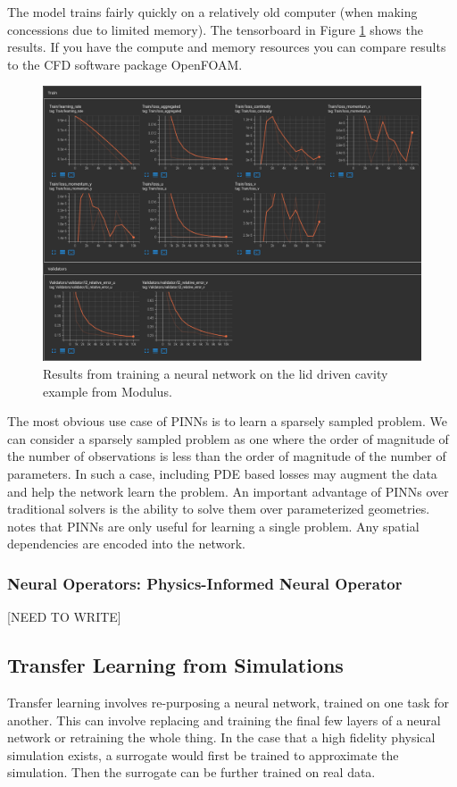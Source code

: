 \documentclass[]{article}
\begin{document}
The model trains fairly quickly on a relatively old computer (when making concessions due to limited memory).  The tensorboard in Figure \ref{fig:screenshot-2022-05-09-at-17-19-07-tensorboard} shows the results.  If you have the compute and memory resources you can compare results to the CFD software package OpenFOAM.
\begin{figure}
	\centering
	\includegraphics[width=0.7\linewidth]{"images/Screenshot 2022-05-09 at 17-19-07 TensorBoard"}
	\caption[ldc_results]{Results from training a neural network on the lid driven cavity example from Modulus.}
	\label{fig:screenshot-2022-05-09-at-17-19-07-tensorboard}
\end{figure}

The most obvious use case of PINNs is to learn a sparsely sampled problem.  We can consider a sparsely sampled problem as one where the order of magnitude of the number of observations is less than the order of magnitude of the number of parameters.  In such a case, including PDE based losses may augment the data and help the network learn the problem.  An important advantage of PINNs over traditional solvers is the ability to solve them over parameterized geometries.  \cite{neural_operators} notes that PINNs are only useful for learning a single problem.  Any spatial dependencies are encoded into the network.

\subsubsection{Neural Operators: Physics-Informed Neural Operator}
[NEED TO WRITE]

\subsection{Transfer Learning from Simulations}
Transfer learning involves re-purposing a neural network, trained on one task for another.  This can involve replacing and training the final few layers of a neural network or retraining the whole thing.  In the case that a high fidelity physical simulation exists, a surrogate would first be trained to approximate the simulation.  Then the surrogate can be further trained on real data.  
\end{document}
